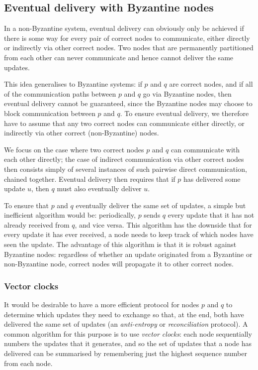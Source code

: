 \documentclass[sigplan,review]{acmart}
\begin{document}
\subsection{Eventual delivery with Byzantine nodes}\label{sec:delivery}

In a non-Byzantine system, eventual delivery can obviously only be achieved if there is some way for every pair of correct nodes to communicate, either directly or indirectly via other correct nodes.
Two nodes that are permanently partitioned from each other can never communicate and hence cannot deliver the same updates.

This idea generalises to Byzantine systems: if $p$ and $q$ are correct nodes, and if all of the communication paths between $p$ and $q$ go via Byzantine nodes, then eventual delivery cannot be guaranteed, since the Byzantine nodes may choose to block communication between $p$ and $q$.
To ensure eventual delivery, we therefore have to assume that any two correct nodes can communicate either directly, or indirectly via other correct (non-Byzantine) nodes.

We focus on the case where two correct nodes $p$ and $q$ can communicate with each other directly; the case of indirect communication via other correct nodes then consists simply of several instances of such pairwise direct communication, chained together.
Eventual delivery then requires that if $p$ has delivered some update $u$, then $q$ must also eventually deliver $u$.

To ensure that $p$ and $q$ eventually deliver the same set of updates, a simple but inefficient algorithm would be: periodically, $p$ sends $q$ every update that it has not already received from $q$, and vice versa.
This algorithm has the downside that for every update it has ever received, a node needs to keep track of which nodes have seen the update.
The advantage of this algorithm is that it is robust against Byzantine nodes: regardless of whether an update originated from a Byzantine or non-Byzantine node, correct nodes will propagate it to other correct nodes.

\subsubsection{Vector clocks}\label{sec:vector-clocks}

It would be desirable to have a more efficient protocol for nodes $p$ and $q$ to determine which updates they need to exchange so that, at the end, both have delivered the same set of updates (an \emph{anti-entropy} or \emph{reconciliation} protocol).
A common algorithm for this purpose is to use \emph{vector clocks}: each node sequentially numbers the updates that it generates, and so the set of updates that a node has delivered can be summarised by remembering just the highest sequence number from each node.
\end{document}
